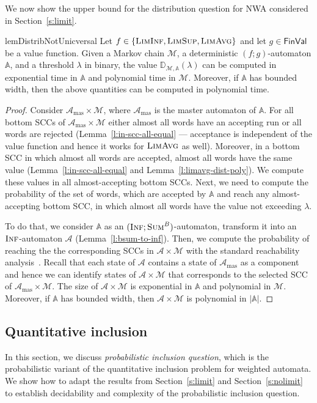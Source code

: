 \documentclass{lmcs}
\newcommand{\masterA}{\mathcal{A}_{\textrm{mas}}}
\newcommand{\nestedA}{\mathbb{A}}
\newcommand{\nonnestedA}{\mathcal{A}}
\newcommand{\fBsum}[1]{\textsc{Sum}^{#1}}
\newcommand{\flimavg}{\textsc{LimAvg}}
\newcommand{\fliminf}{\textsc{LimInf}}
\newcommand{\flimsup}{\textsc{LimSup}}
\newcommand{\finf}{\textsc{Inf}}
\newcommand{\const}{\lambda}
\newcommand{\FinVal}{\mathsf{FinVal}}
\newcommand{\distrib}{\mathbb{D}}
\newcommand{\markov}{\mathcal{M}}
\begin{document}
We now show the upper bound for the distribution question for NWA considered in Section~\ref{s:limit}.



\begin{restatable}{lem}{DistribNotUnicversal}\label{l:notUniversalDistrib}
Let $f \in \{\fliminf, \flimsup, \flimavg\}$ and let $g \in \FinVal$ be a value function.
Given a Markov chain $\markov$, a deterministic $(f;g)$-automaton $\nestedA$, and a
threshold $\const$ in binary, the value $\distrib_{\markov,\nestedA}(\const)$
can be computed in exponential time in $\nestedA$ and polynomial time in $\markov$.
Moreover, if $\nestedA$ has bounded width, then the above quantities can be computed in polynomial time.
\end{restatable}
\begin{proof}
Consider $\masterA \times \markov$, where $\masterA$ is the master automaton of $\nestedA$.
For all bottom SCCs of  $\masterA \times \markov$ either almost all words have an accepting run or all words are rejected (Lemma~\ref{l:in-scc-all-equal} --- acceptance is independent of the value function and hence it works for $\flimavg$ as well).
Moreover, in a bottom SCC in which almost all words are accepted, almost all words have the same value (Lemma~\ref{l:in-scc-all-equal} and Lemma~\ref{l:limavg-dist-poly}).
We compute these values in all almost-accepting bottom SCCs.
Next, we need to compute the probability of the set of words, which are accepted by $\nestedA$ and reach any almost-accepting bottom SCC, in which almost all words have the value not exceeding $\lambda$.

To do that, we consider $\nestedA$ as an $(\finf;\fBsum{B})$-automaton, transform it into an $\finf$-automaton $\nonnestedA$ (Lemma~\ref{l:bsum-to-inf}).
Then, we compute the probability of reaching the the corresponding SCCs in $\nonnestedA \times \markov$ with the standard reachability analysis~\cite{BaierBook}.
Recall that each state of $\nonnestedA$ contains a state of $\masterA$ as a component and hence we can identify states of
$\nonnestedA \times \markov$ that corresponds to the selected SCC of  $\masterA \times \markov$.
The size of $\nonnestedA \times \markov$ is exponential in $\nestedA$ and polynomial in $\markov$.
Moreover, if $\nestedA$ has bounded width, then
$\nonnestedA \times \markov$  is polynomial in $|\nestedA|$.
\end{proof}



\subsection{Quantitative inclusion}
In this section, we discuss \emph{probabilistic inclusion question}, which is the probabilistic variant of the quantitative inclusion problem for weighted automata.
We show how to adapt the results from Section~\ref{s:limit} and Section~\ref{s:nolimit} to establish decidability and complexity of the probabilistic inclusion question.
\smallskip
\end{document}

